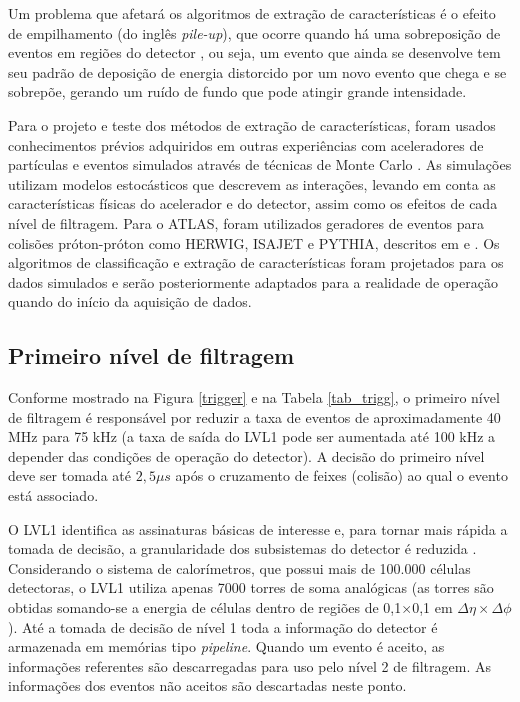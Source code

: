 Um problema que afetará os algoritmos de extração de
características é o efeito de empilhamento (do inglês
\textit{pile-up}), que ocorre quando há uma sobreposição de
eventos em regiões do detector \cite{article:seixas:1996}, ou
seja, um evento que ainda se desenvolve tem seu padrão de
deposição de energia distorcido por um novo evento que chega e se
sobrepõe, gerando um ruído de fundo que pode atingir grande
intensidade.

Para o projeto e teste dos métodos de extração de características,
foram usados conhecimentos prévios adquiridos em outras experiências
com aceleradores de partículas e eventos simulados através de
técnicas de Monte Carlo \cite{book:montecarlo:2004}. As
si\-mu\-la\-ções utilizam modelos estocásticos que descrevem as interações,
 levando em conta as carac\-terísticas físicas do
acelerador e do detector, assim como os efeitos de cada nível de
filtragem. Para o ATLAS, foram utilizados ge\-ra\-do\-res de eventos
para colisões próton-próton como HERWIG, ISAJET e PYTHIA, descritos
em \cite{TDR1:ATLAS:1999} e \cite{TDR:ATLAS:2003}. Os algoritmos de
classificação e extração de carac\-terísticas foram projetados para
os dados simulados e serão posteriormente adaptados para a realidade
de operação quando do início da aquisição de dados.

\subsection{Primeiro nível de filtragem}

Conforme mostrado na Figura \ref{trigger} e na Tabela
\ref{tab_trigg}, o primeiro nível de filtragem é responsável por
reduzir a taxa de eventos de aproximadamente 40 MHz para 75 kHz (a
taxa de saída do LVL1 pode ser aumentada até 100 kHz a depender
das condições de operação do detector). A decisão do primeiro
nível deve ser tomada até $2,5\mu s$ após o cruzamento de feixes
(colisão) ao qual o evento está associado.


O LVL1 identifica as assinaturas básicas de interesse e, para tornar
mais rápida a tomada de decisão, a granularidade dos subsistemas do
detector é reduzida \cite{TDR:ATLAS:1998}. Considerando o sistema de
calorímetros, que possui mais de 100.000 células detectoras, o LVL1
utiliza apenas 7000 torres de soma analógicas (as torres são obtidas
somando-se a energia de células dentro de regiões de 0,1$\times$0,1
em $\Delta\eta \times \Delta\phi$). Até a tomada de decisão de nível
1 toda a informação do detector é armazenada em memórias tipo
\textit{pipeline}. Quando um evento é aceito, as informações
referentes são descarregadas para uso pelo nível 2 de filtragem. As
informações dos eventos não aceitos são descartadas neste ponto.

